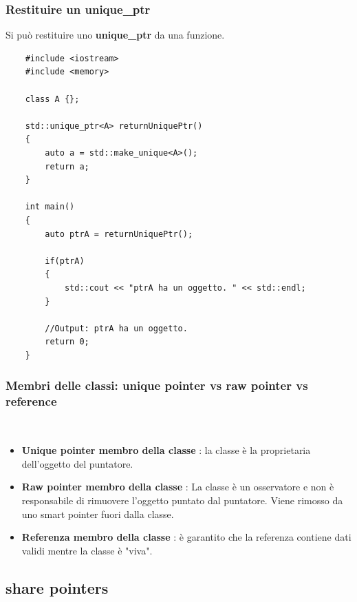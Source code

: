 \subsubsection{Restituire un unique\_ptr}

\textsf{\small Si può restituire uno \textbf{unique\_ptr} da una funzione. } \\

\begin{lstlisting}
	#include <iostream>
	#include <memory>
	
	class A {};
	
	std::unique_ptr<A> returnUniquePtr()
	{
		auto a = std::make_unique<A>();
		return a;
	}

	int main()
	{
		auto ptrA = returnUniquePtr();
		
		if(ptrA)
		{
			std::cout << "ptrA ha un oggetto. " << std::endl;	
		}
	
		//Output: ptrA ha un oggetto.
		return 0;
	}
\end{lstlisting}

\subsubsection{Membri delle classi: unique pointer vs raw pointer vs reference}

\textsf{\small } \\

\begin{itemize}
	\item \textsf{\small \textbf{Unique pointer membro della classe} : la classe è la proprietaria dell'oggetto del puntatore.}
	\item \textsf{\small \textbf{Raw pointer membro della classe} : La classe è un osservatore e non è responsabile di rimuovere l'oggetto puntato dal puntatore. Viene rimosso da uno smart pointer fuori dalla classe.}
	\item \textsf{\small \textbf{Referenza membro della classe} : è garantito che la referenza contiene dati validi mentre la classe è "viva".}
\end{itemize}



\subsection{share pointers}

